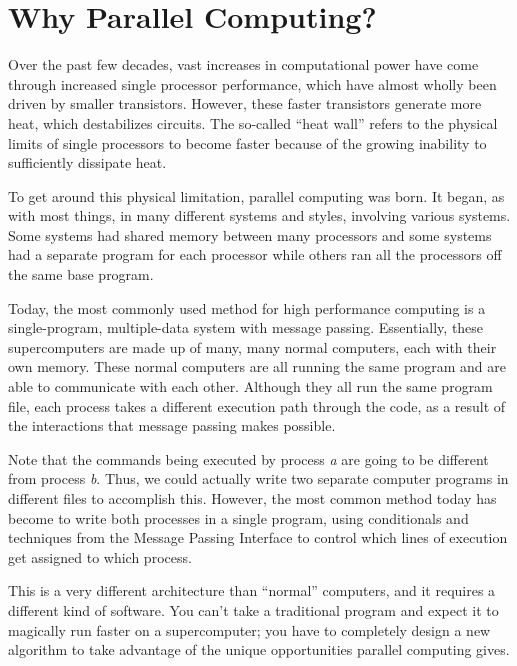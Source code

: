 \label{lab:MPI_Intro}

\section*{Why Parallel Computing?}
Over the past few decades, vast increases in computational power have come through 
increased single processor performance, which have almost wholly been driven by smaller transistors.
However, these faster transistors generate more heat, which destabilizes circuits. 
The so-called ``heat wall'' refers to the physical limits of single processors to 
become faster because of the growing inability to sufficiently dissipate heat.

To get around this physical limitation, parallel computing was born.
It began, as with most things, in many different systems and styles, involving various systems. 
Some systems had shared memory between many processors and some systems had a separate 
program for each processor while others ran all the processors off the same base program.

Today, the most commonly used method for high performance computing is a single-program,
multiple-data system with message passing. 
Essentially, these supercomputers are made up of many, many normal computers, each with their own memory. 
These normal computers are all running the same program and are able to communicate with each other. Although they all run the same program file, each process takes a different execution path through the code, as a result of the interactions that message passing makes possible.

Note that the commands being executed by process \emph{a} are going to be different 
from process \emph{b}. Thus, we could actually write two separate computer programs 
in different files to accomplish this. 
However, the most common method today has become to write both processes in a single program, 
using conditionals and techniques from the Message Passing Interface to control which 
lines of execution get assigned to which process.

This is a very different architecture than ``normal'' computers, and it requires a 
different kind of software. You can't take a traditional program and expect it to 
magically run faster on a supercomputer; you have to completely design a new algorithm 
to take advantage of the unique opportunities parallel computing gives.

